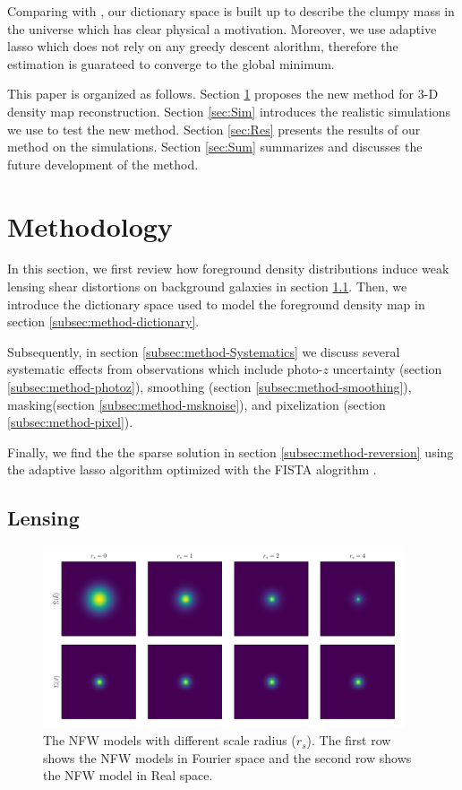 \documentclass[twocolumn]{aastex62}
\begin{document}
Comparing with \citet{LSS-massMap-Glimpse3D-Leonard2014}, our dictionary space is built up to describe the clumpy mass 
in the universe which has clear physical a motivation. Moreover, we use adaptive lasso which does not rely on any greedy 
descent alorithm, therefore the estimation is guarateed to converge to the global minimum.

This paper is organized as follows.
Section \ref{sec:Method} proposes the new method for $3$-D density map reconstruction.
Section \ref{sec:Sim} introduces the realistic simulations we use to test the new method.
Section \ref{sec:Res} presents the results of our method on the simulations.
Section \ref{sec:Sum} summarizes and discusses the future development of the method.

\section{Methodology}
\label{sec:Method}

In this section, we first review how foreground density distributions induce weak lensing shear distortions on background
galaxies in section \ref{subsec:method-delta2shear}.
Then, we introduce the dictionary space used to model the foreground density map in section \ref{subsec:method-dictionary}.

Subsequently, in section \ref{subsec:method-Systematics} we discuss several systematic effects from observations which include 
photo-$z$ uncertainty (section \ref{subsec:method-photoz}),
smoothing (section \ref{subsec:method-smoothing}),
masking(section \ref{subsec:method-msknoise}),
and pixelization (section \ref{subsec:method-pixel}).

Finally, we find the the sparse solution in section \ref{subsec:method-reversion} using the adaptive lasso algorithm 
\citep{AdaLASSO-Zou2006} optimized with the FISTA alogrithm \citep{FISTA-Beck2009}.


\subsection{Lensing}
\label{subsec:method-delta2shear}

\begin{figure}
    \includegraphics[width=0.95\textwidth]{nfwlet-atom-2D.pdf}
    \caption{The NFW models with different scale radius ($r_s$). The first row shows the NFW models in Fourier
            space and the second row shows the NFW model in Real space.}
\end{figure}
\end{document}
